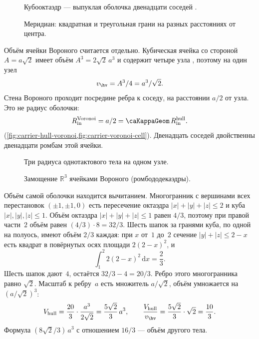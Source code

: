 \begin{figure}[htbp]
  \centering
  
  \caption{Кубооктаэдр --- выпуклая оболочка двенадцати соседей \latGCKshort.}
  \label{fig:carrier-cuboctahedron}
\end{figure}

\begin{figure}[htbp]
  \centering
  
  \caption{Меридиан: квадратная и треугольная грани на разных расстояниях от центра.}
  \label{fig:carrier-cubocta-meridian}
\end{figure}

Объём ячейки Вороного считается отдельно.
Кубическая ячейка со стороной $A=a\sqrt{2}$ имеет объём $A^3=2\sqrt{2}\,a^3$ и содержит четыре узла \latGCKshort, поэтому на один узел
\[
  v_{\hv}=A^3/4=a^3/\sqrt{2}.
\]
Стена Вороного проходит посредине ребра к соседу, на расстоянии $a/2$ от узла.
Это не радиус оболочки:
\[
  R_{\mathrm{in}}^{\mathrm{Voronoi}}=a/2=\caKappaGeom\, R_{\mathrm{in}}^{\mathrm{hull}}.
\]
(\cref{fig:carrier-hull-voronoi,fig:carrier-voronoi-cell}).
Двенадцать соседей двойственны двенадцати ромбам этой ячейки.

\begin{figure}[htbp]
  \centering
  
  \caption{Три радиуса однотактового тела на одном узле.}
  \label{fig:carrier-hull-voronoi}
\end{figure}

\begin{figure}[htbp]
  \centering
  
  \caption{Замощение $\mathbb{R}^3$ ячейками Вороного (ромбододекаэдры).}
  \label{fig:carrier-voronoi-cell}
\end{figure}

Объём самой оболочки находится вычитанием.
Многогранник с вершинами всех перестановок $(\pm 1,\pm 1,0)$ есть пересечение октаэдра $|x|+|y|+|z|\le 2$ и куба $|x|,|y|,|z|\le 1$.
Объём октаэдра $|x|+|y|+|z|\le 1$ равен $4/3$, поэтому при правой части~$2$ объём равен $(4/3)\cdot 8=32/3$.
Шесть шапок за гранями куба, по одной на полуось, имеют объём $2/3$ каждая: при $x$ от~$1$ до~$2$ сечение $|y|+|z|\le 2-x$ есть квадрат в повёрнутых осях площади $2(2-x)^2$, и
\[
  \int_1^2 2(2-x)^2\,\mathrm{d}x=\frac{2}{3}.
\]
Шесть шапок дают~$4$, остаётся $32/3-4=20/3$.
Ребро этого многогранника равно $\sqrt{2}$.
Масштаб к ребру~$a$ есть множитель $a/\sqrt{2}$, объём умножается на $(a/\sqrt{2})^3$:
\[
  V_{\mathrm{hull}}=\frac{20}{3}\cdot\frac{a^3}{2\sqrt{2}}=\frac{5\sqrt{2}}{3}\,a^3,
  \qquad
  \frac{V_{\mathrm{hull}}}{v_{\hv}}=\frac{5\sqrt{2}}{3}\cdot\sqrt{2}=\frac{10}{3}.
\]
Формула $(8\sqrt{2}/3)\,a^3$ с отношением $16/3$ --- объём другого тела.

